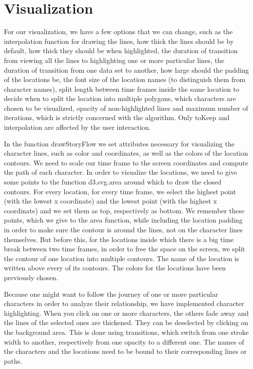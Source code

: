 \documentclass{report}
\begin{document}
\section{Visualization}
\par
For our visualization, we have a few options that we can change, such as the interpolation function for drawing the lines, how thick the lines should be by default, how thick they should be when highlighted, the duration of transition from viewing all the lines to highlighting one or more particular lines, the duration of transition from one data set to another, how large should the padding of the locations be, the font size of the location names (to distinguish them from character names), split length between time frames inside the same location to decide when to split the location into multiple polygons, which characters are chosen to be visualized, opacity of non-highlighted lines and maximum number of iterations, which is strictly concerned with the algorithm. Only toKeep and interpolation are affected by the user interaction.
\par
In the function drawStoryFlow we set attributes necessary for visualizing the character lines, such as color and coordinates, as well as the colors of the location contours. We need to scale our time frame to the screen coordinates and compute the path of each character.
In order to visualize the locations, we need to give some points to the function d3.svg.area around which to draw the closed contours. For every location, for every time frame, we select the highest point (with the lowest x coordinate) and the lowest point (with the highest x coordinate) and we set them as top, respectively as bottom. We remember these points, which we give to the area function, while including the location padding in order to make sure the contour is around the lines, not on the character lines themselves. But before this, for the locations inside which there is a big time break between two time frames, in order to free the space on the screen, we split the contour of one location into multiple contours. The name of the location is written above every of its contours. The colors for the locations have been previously chosen.
\par
Because one might want to follow the journey of one or more particular characters in order to analyze their relationship, we have implemented character highlighting. When you click on one or more characters, the others fade away and the lines of the selected ones are thickened. They can be deselected by clicking on the background area. This is done using transitions, which switch from one stroke width to another, respectively from one opacity to a different one. The names of the characters and the locations need to be bound to their corresponding lines or paths.
\end{document}
